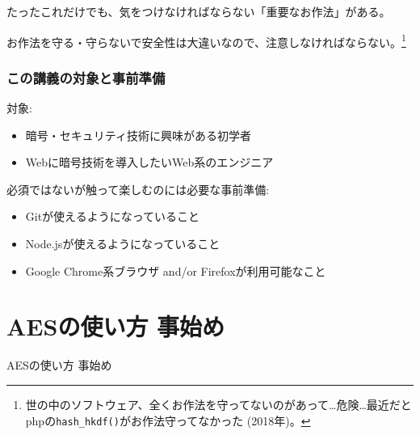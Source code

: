 \documentclass[12pt,dvipdfmx]{beamer}
\begin{document}
\begin{frame}

たったこれだけでも、気をつけなければならない\alert{「重要なお作法」}がある。

\vspace{2ex}

\alert{お作法を守る・守らないで安全性は大違い}なので、注意しなければならない。\footnote[frame]{世の中のソフトウェア、全くお作法を守ってないのがあって…危険…最近だとphpの\texttt{hash\_hkdf()}がお作法守ってなかった (2018年)。}
\end{frame}

\begin{frame}
\frametitle{この講義の対象と事前準備}
対象:
\begin{itemize}
\item 暗号・セキュリティ技術に興味がある初学者
\item Webに暗号技術を導入したいWeb系のエンジニア
\end{itemize}

\vspace{2ex}

必須ではないが触って楽しむのには必要な事前準備:
\begin{itemize}
\item Gitが使えるようになっていること
\item Node.jsが使えるようになっていること
\item Google Chrome系ブラウザ and/or Firefoxが利用可能なこと
\end{itemize}
\end{frame}


\section{AESの使い方 事始め}
\begin{frame}
\centering
{\Large AESの使い方 事始め}
\end{frame}
\end{document}
